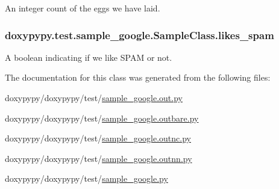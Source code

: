 An integer count of the eggs we have laid. 

\hypertarget{classdoxypypy_1_1test_1_1sample__google_1_1_sample_class_ae9cff04819e3b4bc7ede25037dfaef3d}{
\subsubsection[{likes\-\_\-spam}]{\setlength{\rightskip}{0pt plus 5cm}doxypypy.\-test.\-sample\-\_\-google.\-Sample\-Class.\-likes\-\_\-spam}}\label{classdoxypypy_1_1test_1_1sample__google_1_1_sample_class_ae9cff04819e3b4bc7ede25037dfaef3d}


A boolean indicating if we like S\-P\-A\-M or not. 



The documentation for this class was generated from the following files\-:\begin{DoxyCompactItemize}
\item 
doxypypy/doxypypy/test/\hyperlink{sample__google_8out_8py}{sample\-\_\-google.\-out.\-py}\item 
doxypypy/doxypypy/test/\hyperlink{sample__google_8outbare_8py}{sample\-\_\-google.\-outbare.\-py}\item 
doxypypy/doxypypy/test/\hyperlink{sample__google_8outnc_8py}{sample\-\_\-google.\-outnc.\-py}\item 
doxypypy/doxypypy/test/\hyperlink{sample__google_8outnn_8py}{sample\-\_\-google.\-outnn.\-py}\item 
doxypypy/doxypypy/test/\hyperlink{sample__google_8py}{sample\-\_\-google.\-py}\end{DoxyCompactItemize}

